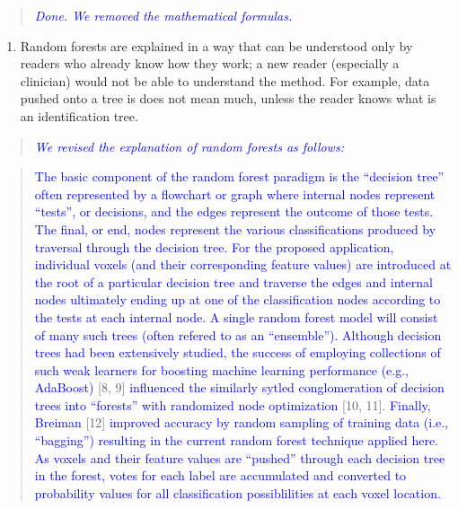 \documentclass[12pt,]{article}
\providecommand{\tightlist}{%
  \setlength{\itemsep}{0pt}\setlength{\parskip}{0pt}}
\begin{document}
\begin{quote}
\emph{\textcolor{blue}{Done.  We removed the mathematical formulas.}}
\end{quote}

\begin{enumerate}
\def\labelenumi{\arabic{enumi}.}
\setcounter{enumi}{6}
\tightlist
\item
  Random forests are explained in a way that can be understood only by
  readers who already know how they work; a new reader (especially a
  clinician) would not be able to understand the method. For example,
  data pushed onto a tree is does not mean much, unless the reader knows
  what is an identification tree.
\end{enumerate}

\begin{quote}
\emph{\textcolor{blue}{
We revised the explanation of random forests as follows:}}
\end{quote}

\begin{quote}
\textcolor{blue}{The basic component of
the random forest paradigm is the ``decision tree'' often represented by a flowchart or
graph where internal nodes represent ``tests'', or decisions, and the edges represent the outcome of those tests.  The final, or end, nodes represent the various classifications produced by traversal through the decision tree.  For the proposed application, individual
voxels (and their corresponding feature values) are introduced at the root of a particular
decision tree and traverse the edges and internal nodes ultimately ending up at one of
the classification nodes according to the tests at each internal node.  A single random
forest model will consist of many such trees (often refered to as an ``ensemble'').}
\textcolor{blue}{Although decision trees had been extensively studied, the success of employing collections of such weak learners for boosting machine learning performance
(e.g., AdaBoost)} {[}8, 9{]}
\textcolor{blue}{influenced the similarly sytled conglomeration of decision trees into ``forests'' with randomized node optimization}
{[}10, 11{]}. \textcolor{blue}{Finally, Breiman} {[}12{]}
\textcolor{blue}{improved accuracy by random sampling of training data (i.e., ``bagging'') resulting
in the current random forest technique applied here.}
\textcolor{blue}{As voxels and their feature values are ``pushed'' through each decision tree in the forest,  votes for each label are accumulated and converted to probability values for all classification possiblilities at
each voxel location.}
\end{quote}
\end{document}
